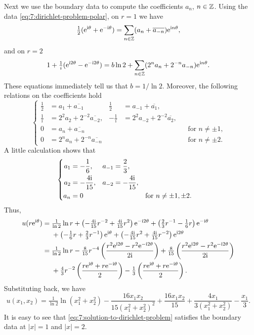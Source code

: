 \begin{solution*}
  Next we use the boundary data to compute the coefficients \(a_n\),
  \(n\in\mathbb{Z}\). Using the data \eqref{eq:7:dirichlet-problem-polar}, on
  \(r=1\) we have
  \[
    \tfrac{1}{2}(\rme^{\rmi\theta}+\rme^{-\rmi\theta})%
    =\sum_{n\in\bbZ}(a_n+\overline{a_{-n}})\rme^{\rmi n\theta},
  \]
  and on \(r=2\)
  \[
    1+\tfrac{1}{i}(\mathrm{e}^{\mathrm{i} 2\theta}-\mathrm{e}^{-\mathrm{i} 2\theta}) = b\ln
    2+\sum_{n\in\mathbb{Z}}(2^na_n+2^{-n}a_{-n})\mathrm{e}^{\mathrm{i} n\theta}.
  \]
  These equations immediately tell us that \(b=1/{\ln 2}\). Moreover, the
  following relations on the coefficients hold
  \[
    \left\{
    \begin{aligned}
      \frac{1}{2}&=a_1+\overline{a_{-1}}
      &\frac{1}{2}&=a_{-1}+\overline{a_1},\\
      \frac{1}{i}&=2^2a_2+2^{-2}\overline{a_{-2}},
      &-\frac{1}{i}&=2^2a_{-2}+2^{-2}\overline{a_{2}},\\
      0&=a_n+\overline{a_{-n}}&&&&\text{for \(n\neq\pm 1\),}\\
      0&=2^{n}a_n+2^{-n}\overline{a_{-n}}&&&&\text{for \(n\neq\pm 2\).}
    \end{aligned}
    \right.
  \]
  A little calculation shows that
  \[
    \left\{
      \begin{aligned}
        a_1&=-\frac{1}{6},&a_{-1}&=\frac{2}{3},\\
        a_2&=-\frac{4\mathrm{i}}{15},&a_{-2}&=-\frac{4\mathrm{i}}{15},\\
        a_n&=0&&&&\text{for \(n\neq \pm 1,\pm 2\).}
      \end{aligned}
    \right.
  \]
  Thus,
  \[
    \begin{aligned}
      u(r\rme^{\rmi\theta})
      &=\tfrac{1}{\ln 2}\ln r
      +\left(-\tfrac{4\rmi}{15}r^{-2}+\tfrac{4\rmi}{15}r^2\right)\rme^{-\rmi
        2\theta} +\left(\tfrac{2}{3}r^{-1}-\tfrac{1}{6}r\right)\rme^{-\rmi\theta}\\
      &\phantom{{}={}}
      +\left(-\tfrac{1}{6}r+\tfrac{2}{3}r^{-1}\right)\rme^{\rmi\theta}
      +\left(-\tfrac{4\rmi}{15}r^2+\tfrac{4\rmi}{15}r^{-2}\right)\rme^{\rmi
        2\theta}\\
      &=\tfrac{1}{\ln 2}\ln r-\tfrac{8}{15}r^{-4}
      \left(\frac{r^2\rme^{\rmi 2\theta}-r^2\rme^{-\rmi 2\theta}}{2\rmi}\right)
      +\tfrac{8}{15}
      \left(\frac{r^2\rme^{\rmi 2\theta}-r^2\rme^{-\rmi
            2\theta}}{2\rmi}\right)\\
      &\phantom{{}={}}
      +\tfrac{4}{3}r^{-2}
      \left(\frac{r\rme^{\rmi\theta}+r\rme^{-\rmi\theta}}{2}\right)
      -\tfrac{1}{3}
      \left(\frac{r\rme^{\rmi\theta}+r\rme^{-\rmi\theta}}{2}\right).
    \end{aligned}
  \]
  Substituting back, we have
  \begin{equation}
    \label{eq:7:solution-to-dirichlet-problem}
    u(x_1,x_2)=\tfrac{1}{\ln 2}\ln(x_1^2+x_2^2)
    -\frac{16x_1x_2}{15{(x_1^2+x_2^2)}^2}+\frac{16x_1x_2}{15}
    +\frac{4x_1}{3(x_1^2+x_2^2)}-\frac{x_1}{3}.
  \end{equation}
  It is easy to see that \eqref{eq:7:solution-to-dirichlet-problem}
  satisfies the boundary data at \(|x|=1\) and \(|x|=2\).
\end{solution*}

